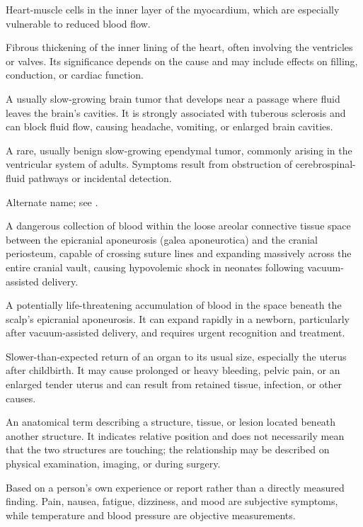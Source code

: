  Heart-muscle cells in the inner layer of the myocardium, which are especially vulnerable to reduced blood flow.

 Fibrous thickening of the inner lining of the heart, often involving the ventricles or valves. Its significance depends on the cause and may include effects on filling, conduction, or cardiac function.

 A usually slow-growing brain tumor that develops near a passage where fluid leaves the brain’s cavities. It is strongly associated with tuberous sclerosis and can block fluid flow, causing headache, vomiting, or enlarged brain cavities.

 A rare, usually benign slow-growing ependymal tumor, commonly arising in the ventricular system of adults. Symptoms result from obstruction of cerebrospinal-fluid pathways or incidental detection.

 Alternate name; see .

 A dangerous collection of blood within the loose areolar connective tissue space between the epicranial aponeurosis (galea aponeurotica) and the cranial periosteum, capable of crossing suture lines and expanding massively across the entire cranial vault, causing hypovolemic shock in neonates following vacuum-assisted delivery.

 A potentially life-threatening accumulation of blood in the space beneath the scalp's
epicranial aponeurosis. It can expand rapidly in a newborn, particularly after vacuum-assisted delivery, and requires
urgent recognition and treatment.

 Slower-than-expected return of an organ to its usual size, especially the uterus after childbirth. It may cause prolonged or heavy bleeding, pelvic pain, or an enlarged tender uterus and can result from retained tissue, infection, or other causes.

 An anatomical term describing a structure, tissue, or lesion located beneath another structure. It indicates relative position and does not necessarily mean that the two structures are touching; the relationship may be described on physical examination, imaging, or during surgery.

 Based on a person's own experience or report rather than a directly measured finding. Pain, nausea, fatigue, dizziness, and mood are subjective symptoms, while temperature and blood pressure are objective measurements.

